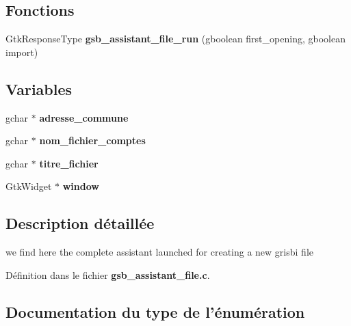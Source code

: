 \subsection*{Fonctions}
\begin{DoxyCompactItemize}
\item 
GtkResponseType {\bf gsb\_\-assistant\_\-file\_\-run} (gboolean first\_\-opening, gboolean import)
\end{DoxyCompactItemize}
\subsection*{Variables}
\begin{DoxyCompactItemize}
\item 
gchar $\ast$ {\bf adresse\_\-commune}
\item 
gchar $\ast$ {\bf nom\_\-fichier\_\-comptes}
\item 
gchar $\ast$ {\bf titre\_\-fichier}
\item 
GtkWidget $\ast$ {\bf window}
\end{DoxyCompactItemize}


\subsection{Description détaillée}
we find here the complete assistant launched for creating a new grisbi file 

Définition dans le fichier {\bf gsb\_\-assistant\_\-file.c}.



\subsection{Documentation du type de l'énumération}
